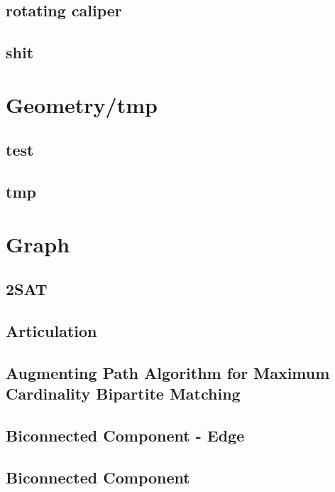 \documentclass[a4paper,5pt,twocolumn,titlepage]{article}
\begin{document}
\subsection{rotating caliper}

\subsection{shit}



\section{Geometry/tmp}
\subsection{test}

\subsection{tmp}


\section{Graph}
\subsection{2SAT}

\subsection{Articulation}

\subsection{Augmenting Path Algorithm for Maximum Cardinality Bipartite Matching}

\subsection{Biconnected Component - Edge}

\subsection{Biconnected Component}

\end{document}
